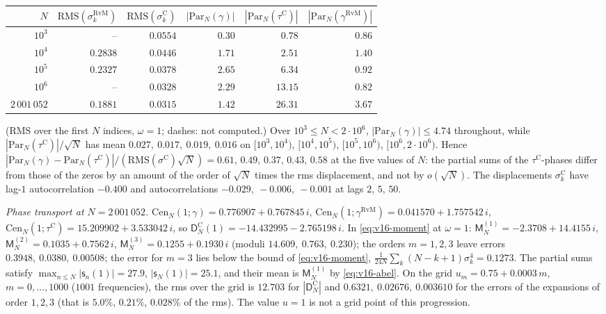 \documentclass[11pt,a4paper]{article}
\numberwithin{equation}{section}
\theoremstyle{definition}
\theoremstyle{remark}
\begin{document}
\begin{center}
\small
\begin{tabular}{rrrrrr}
$N$ & $\mathrm{RMS}(\sigma_k^{\mathrm{RvM}})$ & $\mathrm{RMS}(\sigma_k^{\mathrm C})$ & $|\mathrm{Par}_N(\gamma)|$ & $|\mathrm{Par}_N(\tau^{\mathrm C})|$ & $|\mathrm{Par}_N(\gamma^{\mathrm{RvM}})|$\\\hline
$10^3$ & -- & $0.0554$ & $0.30$ & $0.78$ & $0.86$\\
$10^4$ & $0.2838$ & $0.0446$ & $1.71$ & $2.51$ & $1.40$\\
$10^5$ & $0.2327$ & $0.0378$ & $2.65$ & $6.34$ & $0.92$\\
$10^6$ & -- & $0.0328$ & $2.29$ & $13.15$ & $0.82$\\
$2\,001\,052$ & $0.1881$ & $0.0315$ & $1.42$ & $26.31$ & $3.67$
\end{tabular}
\end{center}
(RMS over the first $N$ indices, $\omega=1$; dashes: not computed.) Over $10^3\le N<2\cdot10^6$, $|\mathrm{Par}_N(\gamma)|\le4.74$ throughout, while $|\mathrm{Par}_N(\tau^{\mathrm C})|/\sqrt N$ has mean $0.027,\ 0.017,\ 0.019,\ 0.016$ on $[10^3,10^4)$, $[10^4,10^5)$, $[10^5,10^6)$, $[10^6,2\cdot10^6)$. Hence $|\mathrm{Par}_N(\gamma)-\mathrm{Par}_N(\tau^{\mathrm C})|/(\mathrm{RMS}(\sigma^{\mathrm C})\sqrt N)=0.61,\,0.49,\,0.37,\,0.43,\,0.58$ at the five values of $N$: the partial sums of the $\tau^{\mathrm C}$-phases differ from those of the zeros by an amount of the order of $\sqrt N$ times the rms displacement, and not by $o(\sqrt N)$. The displacements $\sigma_k^{\mathrm C}$ have lag-$1$ autocorrelation $-0.400$ and autocorrelations $-0.029,\ -0.006,\ -0.001$ at lags $2,\,5,\,50$.

\emph{Phase transport at $N=2\,001\,052$.} $\mathrm{Cen}_N(1;\gamma)=0.776907+0.767845\,i$, $\mathrm{Cen}_N(1;\gamma^{\mathrm{RvM}})=0.041570+1.757542\,i$, $\mathrm{Cen}_N(1;\tau^{\mathrm C})=15.209902+3.533042\,i$, so $\mathsf D_N^{\mathrm C}(1)=-14.432995-2.765198\,i$. In \eqref{eq:v16-moment} at $\omega=1$: $\mathsf M_N^{(1)}=-2.3708+14.4155\,i$, $\mathsf M_N^{(2)}=0.1035+0.7562\,i$, $\mathsf M_N^{(3)}=0.1255+0.1930\,i$ (moduli $14.609,\ 0.763,\ 0.230$); the orders $m=1,2,3$ leave errors $0.3948,\ 0.0380,\ 0.00508$; the error for $m=3$ lies below the bound of \eqref{eq:v16-moment}, $\frac1{24N}\sum_k(N-k+1)\sigma_k^4=0.1273$. The partial sums satisfy $\max_{n\le N}|\mathsf s_n(1)|=27.9$, $|\mathsf s_N(1)|=25.1$, and their mean is $\mathsf M_N^{(1)}$ by \eqref{eq:v16-abel}. On the grid $u_m=0.75+0.0003\,m$, $m=0,\dots,1000$ ($1001$ frequencies), the rms over the grid is $12.703$ for $|\mathsf D_N^{\mathrm C}|$ and $0.6321,\ 0.02676,\ 0.003610$ for the errors of the expansions of order $1,2,3$ (that is $5.0\%$, $0.21\%$, $0.028\%$ of the rms). The value $u=1$ is not a grid point of this progression.
\end{document}
